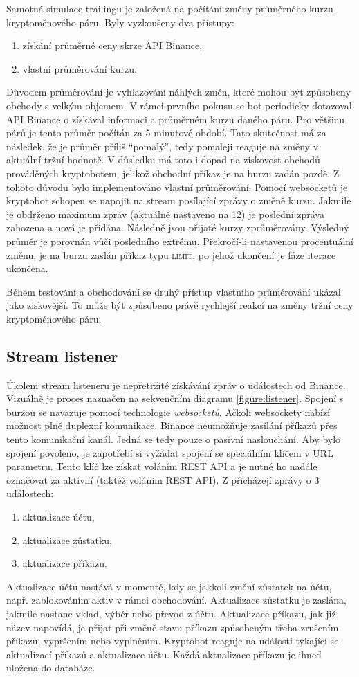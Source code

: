 Samotná simulace trailingu je založená na počítání změny průměrného kurzu kryptoměnového páru. Byly vyzkoušeny dva přístupy:
\begin{enumerate}
    \item získání průměrné ceny skrze API Binance,
    \item vlastní průměrování kurzu.
\end{enumerate}
Důvodem průměrování je vyhlazování náhlých změn, které mohou být způsobeny obchody s velkým objemem.
V rámci prvního pokusu se bot periodicky dotazoval API Binance o získával informaci a průměrném kurzu daného páru. Pro většinu párů je tento průměr počítán za 5 minutové období. Tato skutečnost má za následek, že
je průměr příliš \enquote{pomalý}, tedy pomaleji reaguje na změny v aktuální tržní hodnotě. V důsledku má toto i dopad na ziskovost obchodů prováděných kryptobotem, jelikož obchodní příkaz je na burzu zadán pozdě.
Z tohoto důvodu bylo implementováno vlastní průměrování. Pomocí websocketů je kryptobot schopen se napojit na stream posílající zprávy o změně kurzu. Jakmile je obdrženo maximum zpráv (aktuálně nastaveno na 12) je
poslední zpráva zahozena a nová je přidána. Následně jsou přijaté kurzy zprůměrovány. Výsledný průměr je porovnán vůči posledního extrému. Překročí-li nastavenou procentuální změnu, je na burzu zaslán příkaz typu
\textsc{limit}, po jehož ukončení je fáze iterace ukončena.

Během testování a obchodování se druhý přístup vlastního průměrování ukázal jako ziskovější. To může být způsobeno právě rychlejší reakcí na změny tržní ceny kryptoměnového páru.

\subsection{Stream listener}
Úkolem stream listeneru je nepřetržité získávání zpráv o událostech od Binance. Vizuálně je proces naznačen na sekvenčním diagramu \ref{figure:listener}.
Spojení s burzou se navazuje pomocí technologie \emph{websocketů}. Ačkoli websockety nabízí možnost plně duplexní komunikace, Binance
neumožňuje zasílání příkazů přes tento komunikační kanál. Jedná se tedy pouze o pasivní naslouchání. Aby bylo spojení povoleno, je zapotřebí si vyžádat spojení se speciálním klíčem v URL parametru.
Tento klíč lze získat voláním REST API a je nutné ho nadále označovat za aktivní (taktéž voláním REST API). Z přicházejí zprávy o 3 událostech:
\begin{enumerate}
    \item aktualizace účtu,
    \item aktualizace zůstatku,
    \item aktualizace příkazu.
\end{enumerate}
Aktualizace účtu nastává v momentě, kdy se jakkoli změní zůstatek na účtu, např. zablokováním aktiv v rámci obchodování. Aktualizace zůstatku je zaslána, jakmile nastane vklad, výběr nebo převod z účtu.
Aktualizace příkazu, jak již název napovídá, je přijat při změně stavu příkazu způsobeným třeba zrušením příkazu, vypršením nebo vyplněním. Kryptobot reaguje na události týkající se aktualizací příkazů
a aktualizace účtu. Každá aktualizace příkazu je ihned uložena do databáze.

